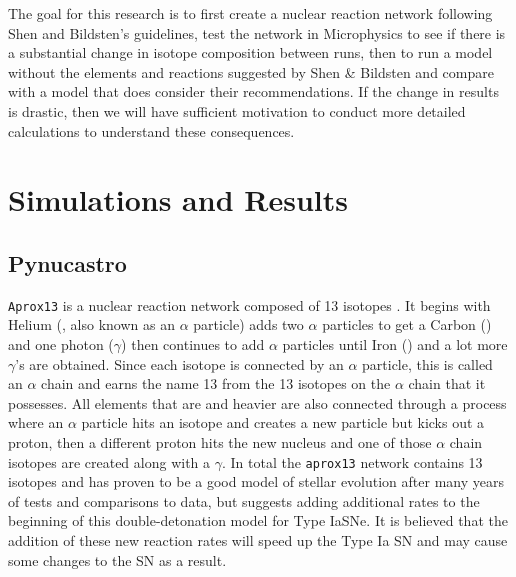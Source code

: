 \documentclass[preprint]{aastex62}
\begin{document}
  The goal for this research is to first create a nuclear reaction network following Shen and Bildsten's guidelines, test the network in Microphysics to see if there is a substantial change in isotope composition between runs, then to run a model without the elements and reactions suggested by Shen \& Bildsten and compare with a model that does consider their recommendations. If the change in results is drastic, then we will have sufficient motivation to conduct more detailed calculations to understand these consequences. 
  
\section{Simulations and Results}
  
  \subsection{Pynucastro}
    
    {\tt Aprox13} is a nuclear reaction network composed of 13 isotopes \citep{timmes}. It begins with Helium (, also known as an $\alpha$ particle) adds two $\alpha$ particles to get a Carbon () and one photon ($\gamma$) then continues to add $\alpha$ particles until Iron () and a lot more $\gamma$'s are obtained. Since each isotope is connected by an $\alpha$ particle, this is called an $\alpha$ chain and earns the name 13 from the 13 isotopes on the $\alpha$ chain that it possesses. All elements that are  and heavier are also connected through a process where an $\alpha$ particle hits an isotope and creates a new particle but kicks out a proton, then a different proton hits the new nucleus and one of those $\alpha$ chain isotopes are created along with a $\gamma$. In total the {\tt aprox13} network contains 13 isotopes and has proven to be a good model of stellar evolution after many years of tests and comparisons to data, but \citet{shenNbildsten} suggests adding additional rates to the beginning of this double-detonation model for Type IaSNe. It is believed that the addition of these new reaction rates will speed up the Type Ia SN and may cause some changes to the SN as a result.   
    
\end{document}

